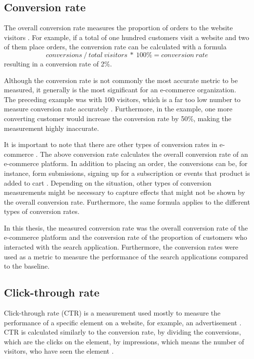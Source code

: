 \subsection{Conversion rate}
\label{ss:conversion}
The overall conversion rate measures the proportion of orders to the website visitors \cite{conversionRate}.
For example, if a total of one hundred customers visit a website and two of them place orders, 
the conversion rate can be calculated with a formula
\[conversions\ /\ total\ visitors\ *\ 100\% = conversion\ rate \]
resulting in a conversion rate of 2\%.

Although the conversion rate is not commonly the most accurate metric to be measured, 
it generally is the most significant for an e-commerce organization.
The preceding example was with 100 visitors, which is a far too low number to measure conversion rate accurately \cite{conversionRateWhat}.
Furthermore, in the example, one more converting customer would increase the conversion rate by 50\%,
making the measurement highly inaccurate.


It is important to note that there are other types of conversion rates in e-commerce \cite{conversionRate}.
The above conversion rate calculates the overall conversion rate of an e-commerce platform.
In addition to placing an order, the conversions can be, for instance, form submissions, signing up for a subscription 
or events that product is added to cart \cite{conversionRateWhat}.
Depending on the situation, other types of conversion measurements might be necessary 
to capture effects that might not be shown by the overall conversion rate.
Furthermore, the same formula applies to the different types of conversion rates.


In this thesis, the measured conversion rate was the overall conversion rate of the e-commerce platform and 
the conversion rate of the proportion of customers who interacted with the search application.
Furthermore, the conversion rates were used as a metric to measure the performance of the search applications
compared to the baseline.


\subsection{Click-through rate}
\label{ss:ctr}

Click-through rate (CTR) is a measurement used mostly to measure the performance of a specific element on a website, 
for example, an advertisement \cite{ctrWhat}. 
CTR is calculated similarly to the conversion rate,
by dividing the conversions, which are the clicks on the element,
by impressions, which means the number of visitors, who have seen the element \cite{ctrWhat}.


